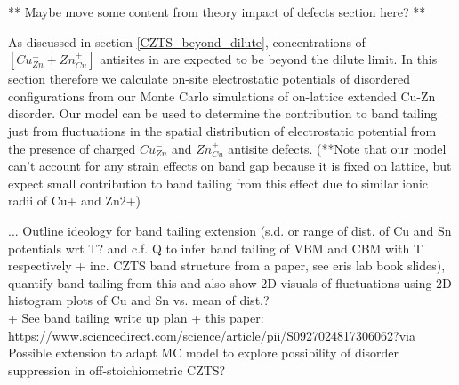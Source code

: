 \documentclass[11pt, twoside]{report}
\begin{document}
** Maybe move some content from theory impact of defects section here? **

As discussed in section \ref{CZTS_beyond_dilute}, concentrations of $[Cu_{Zn}^{-} + Zn_{Cu}^{+}]$ antisites in {\CZTS} are expected to be beyond the dilute limit. In this section therefore we calculate on-site electrostatic potentials of disordered configurations from our Monte Carlo simulations of on-lattice extended Cu-Zn disorder. Our model can be used to determine the contribution to band tailing just from fluctuations in the spatial distribution of electrostatic potential from the presence of charged $Cu_{Zn}^{-}$ and $Zn_{Cu}^{+}$ antisite defects. (**Note that our model can't account for any strain effects on band gap because it is fixed on lattice, but expect small contribution to band tailing from this effect due to similar ionic radii of Cu+ and Zn2+)

... Outline ideology for band tailing extension (s.d. or range of dist. of Cu and Sn potentials wrt T? and c.f. Q to infer band tailing of VBM and CBM with T respectively + inc. CZTS band structure from a paper, see eris lab book slides), quantify band tailing from this and also show 2D visuals of fluctuations using 2D histogram plots of Cu and Sn vs. mean of dist.?\\

+ See band tailing write up plan + this paper: https://www.sciencedirect.com/science/article/pii/S0927024817306062?via%
\\

Possible extension to adapt MC model to explore possibility of disorder suppression in off-stoichiometric CZTS?\\
\end{document}

